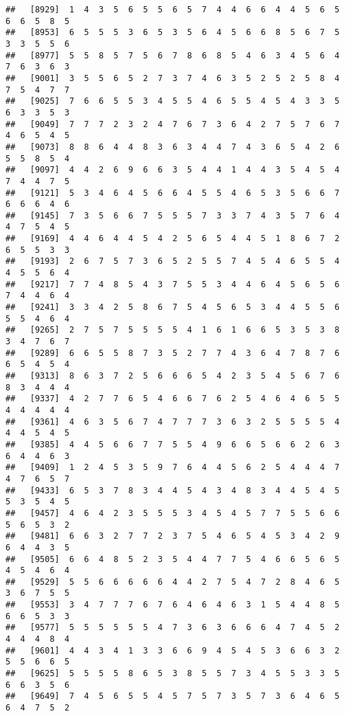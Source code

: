 \documentclass[
]{book}
\begin{document}
\begin{verbatim}
##   [8929]  1  4  3  5  6  5  5  6  5  7  4  4  6  6  4  4  5  6  5  6  6  5  8  5
##   [8953]  6  5  5  5  3  6  5  3  5  6  4  5  6  6  8  5  6  7  5  3  3  5  5  6
##   [8977]  5  5  8  5  7  5  6  7  8  6  8  5  4  6  3  4  5  6  4  7  6  3  6  3
##   [9001]  3  5  5  6  5  2  7  3  7  4  6  3  5  2  5  2  5  8  4  7  5  4  7  7
##   [9025]  7  6  6  5  5  3  4  5  5  4  6  5  5  4  5  4  3  3  5  6  3  3  5  3
##   [9049]  7  7  7  2  3  2  4  7  6  7  3  6  4  2  7  5  7  6  7  4  6  5  4  5
##   [9073]  8  8  6  4  4  8  3  6  3  4  4  7  4  3  6  5  4  2  6  5  5  8  5  4
##   [9097]  4  4  2  6  9  6  6  3  5  4  4  1  4  4  3  5  4  5  4  7  4  4  7  5
##   [9121]  5  3  4  6  4  5  6  6  4  5  5  4  6  5  3  5  6  6  7  6  6  6  4  6
##   [9145]  7  3  5  6  6  7  5  5  5  7  3  3  7  4  3  5  7  6  4  4  7  5  4  5
##   [9169]  4  4  6  4  4  5  4  2  5  6  5  4  4  5  1  8  6  7  2  6  5  5  3  3
##   [9193]  2  6  7  5  7  3  6  5  2  5  5  7  4  5  4  6  5  5  4  4  5  5  6  4
##   [9217]  7  7  4  8  5  4  3  7  5  5  3  4  4  6  4  5  6  5  6  7  4  4  6  4
##   [9241]  3  3  4  2  5  8  6  7  5  4  5  6  5  3  4  4  5  5  6  5  5  4  6  4
##   [9265]  2  7  5  7  5  5  5  5  4  1  6  1  6  6  5  3  5  3  8  3  4  7  6  7
##   [9289]  6  6  5  5  8  7  3  5  2  7  7  4  3  6  4  7  8  7  6  6  5  4  5  4
##   [9313]  8  6  3  7  2  5  6  6  6  5  4  2  3  5  4  5  6  7  6  8  3  4  4  4
##   [9337]  4  2  7  7  6  5  4  6  6  7  6  2  5  4  6  4  6  5  5  4  4  4  4  4
##   [9361]  4  6  3  5  6  7  4  7  7  7  3  6  3  2  5  5  5  5  4  4  4  5  4  5
##   [9385]  4  4  5  6  6  7  7  5  5  4  9  6  6  5  6  6  2  6  3  6  4  4  6  3
##   [9409]  1  2  4  5  3  5  9  7  6  4  4  5  6  2  5  4  4  4  7  4  7  6  5  7
##   [9433]  6  5  3  7  8  3  4  4  5  4  3  4  8  3  4  4  5  4  5  5  3  5  4  5
##   [9457]  4  6  4  2  3  5  5  5  3  4  5  4  5  7  7  5  5  6  6  5  6  5  3  2
##   [9481]  6  6  3  2  7  7  2  3  7  5  4  6  5  4  5  3  4  2  9  6  4  4  3  5
##   [9505]  6  6  4  8  5  2  3  5  4  4  7  7  5  4  6  6  5  6  5  4  5  4  6  4
##   [9529]  5  5  6  6  6  6  6  4  4  2  7  5  4  7  2  8  4  6  5  3  6  7  5  5
##   [9553]  3  4  7  7  7  6  7  6  4  6  4  6  3  1  5  4  4  8  5  6  6  5  3  3
##   [9577]  5  5  5  5  5  5  4  7  3  6  3  6  6  6  4  7  4  5  2  4  4  4  8  4
##   [9601]  4  4  3  4  1  3  3  6  6  9  4  5  4  5  3  6  6  3  2  5  5  6  6  5
##   [9625]  5  5  5  5  8  6  5  3  8  5  5  7  3  4  5  5  3  3  5  6  6  3  5  6
##   [9649]  7  4  5  6  5  5  4  5  7  5  7  3  5  7  3  6  4  6  5  6  4  7  5  2

\end{verbatim}
\end{document}
